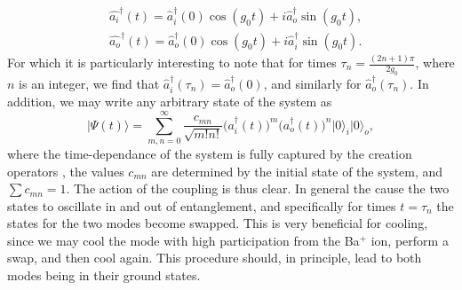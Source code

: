 \begin{align}
    &\hat{a_i}^\dagger(t) = \hat{a}_i^\dagger(0)\cos(g_0t) + i\hat{a}_o^\dagger\sin(g_0t),\\
    &\hat{a_o}^\dagger(t) = \hat{a}_o^\dagger(0)\cos(g_0t) + i\hat{a}_i^\dagger\sin(g_0t).
\end{align}
For which it is particularly interesting to note that for times $\tau_n = \frac{(2n+1)\pi}{2g_0}$, where $n$ is an integer, we find that $\hat{a}_i^\dagger(\tau_n) = \hat{a}_o^\dagger(0)$, and similarly for $\hat{a}_o^\dagger(\tau_n)$. In addition, we may write any arbitrary state of the system as
\begin{equation}
    \vert \Psi(t)\rangle = \sum_{m,n = 0}^\infty \frac{c_{mn}}{\sqrt{m!n!}}\big(a_i^\dagger(t)\big)^m\big(a_o^\dagger(t)\big)^n\vert 0\rangle_i\vert 0\rangle_o,
\end{equation}
where the time-dependance of the system is fully captured by the creation operators \cite{hou2022coherently}, the values $c_{mn}$ are determined by the initial state of the system, and $\sum c_{mn} =1$.
The action of the coupling is thus clear. In general the cause the two states to oscillate in and out of entanglement, and specifically for times $t = \tau_n$ the states for the two modes become swapped.
This is very beneficial for cooling, since we may cool the mode with high participation from the Ba$^+$ ion, perform a swap, and then cool again. This procedure should, in principle, lead to both modes being in their ground states.


